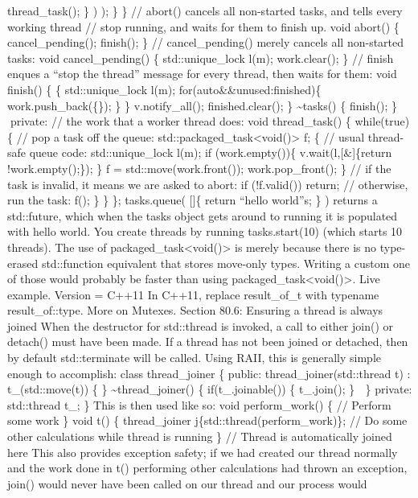 thread\_task(); \} ) ); \} \} // abort() cancels all non-started tasks,
and tells every working thread // stop running, and waits for them to
finish up. void abort() \{ cancel\_pending(); finish(); \} //
cancel\_pending() merely cancels all non-started tasks: void
cancel\_pending() \{ std::unique\_lock l(m); work.clear(); \} // finish
enques a ``stop the thread'' message for every thread, then waits for
them: void finish() \{ \{ std::unique\_lock l(m);
for(auto\&\&unused:finished)\{ work.push\_back(\{\}); \} \}
v.notify\_all(); finished.clear(); \} \textasciitilde tasks() \{
finish(); \} private: // the work that a worker thread does: void
thread\_task() \{ while(true)\{ // pop a task off the queue:
std::packaged\_task\textless void()\textgreater{} f; \{ // usual
thread-safe queue code: std::unique\_lock l(m); if (work.empty())\{
v.wait(l,{[}\&{]}\{return !work.empty();\}); \} f =
std::move(work.front()); work.pop\_front(); \} // if the task is
invalid, it means we are asked to abort: if (!f.valid()) return; //
otherwise, run the task: f(); \} \} \}; tasks.queue( {[}{]}\{ return
``hello world''s; \} ) returns a std::future, which when the tasks
object gets around to running it is populated with hello world. You
create threads by running tasks.start(10) (which starts 10 threads). The
use of packaged\_task\textless void()\textgreater{} is merely because
there is no type-erased std::function equivalent that stores move-only
types. Writing a custom one of those would probably be faster than using
packaged\_task\textless void()\textgreater. Live example. Version =
C++11 In C++11, replace result\_of\_t with typename result\_of::type.
More on Mutexes. Section 80.6: Ensuring a thread is always joined When
the destructor for std::thread is invoked, a call to either join() or
detach() must have been made. If a thread has not been joined or
detached, then by default std::terminate will be called. Using RAII,
this is generally simple enough to accomplish: class thread\_joiner \{
public: thread\_joiner(std::thread t) : t\_(std::move(t)) \{ \}
\textasciitilde thread\_joiner() \{ if(t\_.joinable()) \{ t\_.join(); \}
 \} private: std::thread t\_; \} This is then used like so: void
perform\_work() \{ // Perform some work \} void t() \{ thread\_joiner
j\{std::thread(perform\_work)\}; // Do some other calculations while
thread is running \} // Thread is automatically joined here This also
provides exception safety; if we had created our thread normally and the
work done in t() performing other calculations had thrown an exception,
join() would never have been called on our thread and our process would
